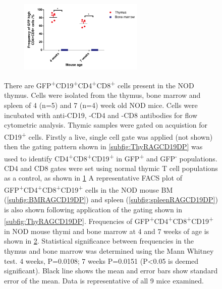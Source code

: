 \begin{figure}
\begin{subfigure}{0.25\textwidth}
	\label{subfig:Tcellgate}
	\end{subfigure}
	\begin{subfigure}{\textwidth}
	\centering
	\caption{}
	\includegraphics[width=0.65\textwidth]{Figures/Newallposgraph.pdf}	
	\label{BMvThyDPgraph}
	\end{subfigure}
\caption[There are GFP\textsuperscript{+}CD19\textsuperscript{+}CD4\textsuperscript{+}CD8\textsuperscript{+} cells present in the NOD thymus] {There are GFP\textsuperscript{+}CD19\textsuperscript{+}CD4\textsuperscript{+}CD8\textsuperscript{+} cells present in the NOD thymus.
Cells were isolated from the thymus, bone marrow and spleen of 4 (n=5) and 7 (n=4) week old NOD mice.
Cells were incubated with anti-CD19, -CD4 and -CD8 antibodies for flow cytometric analysis.
Thymic samples were gated on acquistion for CD19\textsuperscript{+} cells.
Firstly a live, single cell gate was applied (not shown) then the gating pattern shown in \ref{subfig:ThyRAGCD19DP} was used to identify CD4\textsuperscript{+}CD8\textsuperscript{+}CD19\textsuperscript{+} in GFP\textsuperscript{+} and GFP\textsuperscript{-} populations.
CD4 and CD8 gates were set using normal thymic T cell populations as a control, as shown in \ref{subfig:Tcellgate}
A representative FACS plot of GFP\textsuperscript{+}CD4\textsuperscript{+}CD8\textsuperscript{+}CD19\textsuperscript{+} cells in the NOD mouse BM (\ref{subfig:BMRAGCD19DP}) and spleen (\ref{subfig:spleenRAGCD19DP}) is also shown following application of the gating shown in \ref{subfig:ThyRAGCD19DP}.
Frequencies of GFP\textsuperscript{+}CD4\textsuperscript{+}CD8\textsuperscript{+}CD19\textsuperscript{+} in NOD mouse thymi and bone marrow at 4 and 7 weeks of age is shown in \ref{BMvThyDPgraph}.
Statistical significance between frequencies in the thymus and bone marrow was determined using the Mann Whitney test. 4 weeks, P=0.0108; 7 weeks P=0.0151 (P<0.05 is deemed significant). Black line shows the mean and error bars show standard error of the mean.
Data is representative of all 9 mice examined.}
\label{fig:RAGCD19DP}
\end{figure}

